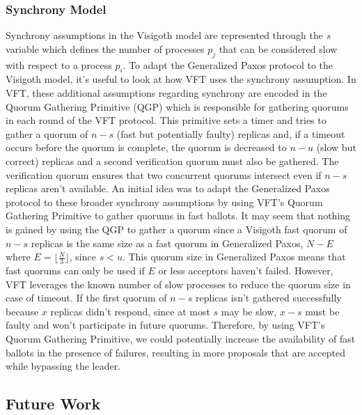\documentclass[runningheads,a4paper]{llncs}
\begin{document}
\subsubsection{Synchrony Model}
Synchrony assumptions in the Visigoth model are represented through the $s$ variable which defines the number of processes $p_j$ that can be considered slow with respect to a process $p_i$. To adapt the Generalized Paxos protocol to the Visigoth model, it's useful to look at how VFT uses the synchrony assumption. In VFT, these additional assumptions regarding synchrony are encoded in the Quorum Gathering Primitive (QGP) which is responsible for gathering quorums in each round of the VFT protocol. This primitive sets a timer and tries to gather a quorum of $n-s$ (fast but potentially faulty) replicas  and, if a timeout occurs before the quorum is complete, the quorum is decreased to $n-u$ (slow but correct) replicas and a second verification quorum must also be gathered. The verification quorum ensures that two concurrent quorums intersect even if $n-s$ replicas aren't available. An initial idea was to adapt the Generalized Paxos protocol to these broader synchrony assumptions by using VFT's Quorum Gathering Primitive to gather quorums in fast ballots. It may seem that nothing is gained by using the QGP to gather a quorum since a Visigoth fast quorum of $n-s$ replicas is the same size as a fast quorum in Generalized Paxos, $N-E$ where $E= \lfloor \frac{N}{3}\rfloor$, since $s < u$. This quorum size in Generalized Paxos means that fast quorums can only be used if $E$ or less acceptors haven't failed. However, VFT leverages the known number of slow processes to reduce the quorum size in case of timeout. If the first quorum of $n-s$ replicas isn't gathered successfully because $x$ replicas didn't respond, since at most $s$ may be slow, $x-s$ must be faulty and won't participate in future quorums. Therefore, by using VFT's Quorum Gathering Primitive, we could potentially increase the availability of fast ballots in the presence of failures, resulting in more proposals that are accepted while bypassing the leader. \par

\subsection{Future Work} \label{Future Work}
\end{document}

